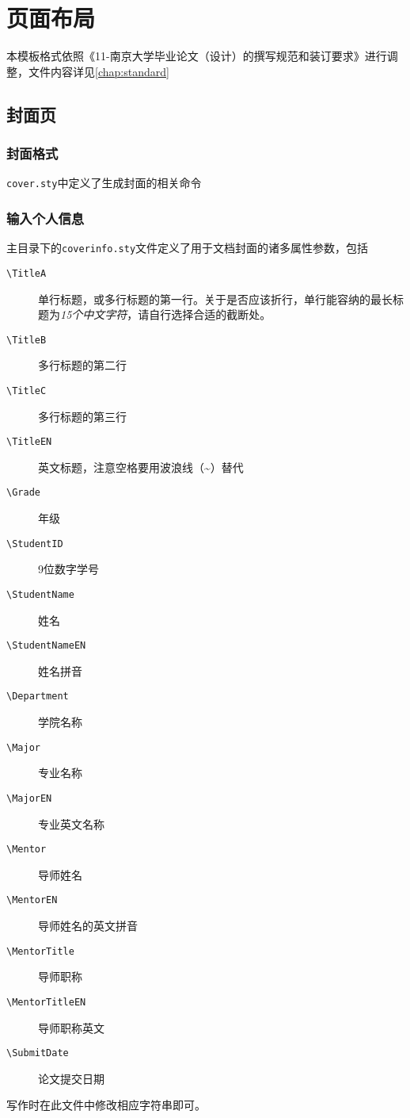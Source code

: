 \chapter{页面布局}

本模板格式依照《11-南京大学毕业论文（设计）的撰写规范和装订要求》进行调整，文件内容详见\cref{chap:standard}

\section{封面页}

\subsection{封面格式}

\texttt{cover.sty}中定义了生成封面的相关命令

\subsection{输入个人信息}

主目录下的\texttt{coverinfo.sty}文件定义了用于文档封面的诸多属性参数，包括

\begin{description}
    \item[\texttt{\textbackslash TitleA}] 单行标题，或多行标题的第一行。关于是否应该折行，单行能容纳的最长标题为\emph{15个中文字符}，请自行选择合适的截断处。
    \item[\texttt{\textbackslash TitleB}] 多行标题的第二行
    \item[\texttt{\textbackslash TitleC}] 多行标题的第三行
    \item[\texttt{\textbackslash Title\textunderscore EN}] 英文标题，注意空格要用波浪线（\textasciitilde）替代
    \item[\texttt{\textbackslash Grade}] 年级
    \item[\texttt{\textbackslash StudentID}] 9位数字学号
    \item[\texttt{\textbackslash StudentName}] 姓名
    \item[\texttt{\textbackslash StudentName\textunderscore EN}] 姓名拼音 
    \item[\texttt{\textbackslash Department}] 学院名称
    \item[\texttt{\textbackslash Major}] 专业名称
    \item[\texttt{\textbackslash Major\textunderscore EN}] 专业英文名称
    \item[\texttt{\textbackslash Mentor}] 导师姓名
    \item[\texttt{\textbackslash Mentor\textunderscore EN}] 导师姓名的英文拼音  
    \item[\texttt{\textbackslash MentorTitle}] 导师职称
    \item[\texttt{\textbackslash MentorTitle\textunderscore EN}] 导师职称英文
    \item[\texttt{\textbackslash SubmitDate}] 论文提交日期
\end{description}
写作时在此文件中修改相应字符串即可。

